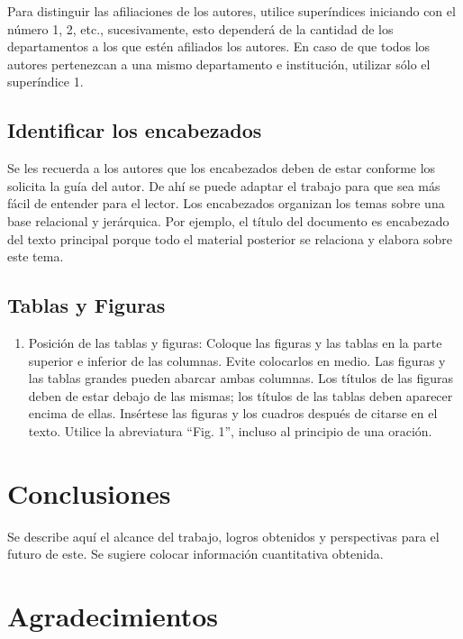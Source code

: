     Para distinguir las afiliaciones de los autores, utilice superíndices iniciando con el número 1, 2, etc., sucesivamente, esto dependerá de la cantidad de los departamentos a los que estén afiliados los autores. En caso de que todos los autores pertenezcan a una mismo departamento e institución, utilizar sólo el superíndice 1. 
    
    \subsection{Identificar los encabezados}
    
    Se les recuerda a los autores que los encabezados deben de estar conforme los solicita la guía del autor. De ahí se puede adaptar el trabajo para que sea más fácil de entender para el lector.
    Los encabezados organizan los temas sobre una base relacional y jerárquica. Por ejemplo, el título del documento es encabezado del texto principal porque todo el material posterior se relaciona y elabora sobre este tema. 
    
    \subsection{Tablas y Figuras}
    
    \begin{enumerate}
        \item Posición de las tablas y figuras: Coloque las figuras y las tablas en la parte superior e inferior de las columnas. Evite colocarlos en medio. Las figuras y las tablas grandes pueden abarcar ambas columnas. Los títulos de las figuras deben de estar debajo de las mismas; los títulos de las tablas deben aparecer encima de ellas. Insértese las figuras y los cuadros después de citarse en el texto. Utilice la abreviatura “Fig. 1”, incluso al principio de una oración. 
    \end{enumerate}
    
    \section{Conclusiones}
    
    Se describe aquí el alcance del trabajo, logros obtenidos y perspectivas para el futuro de este. Se sugiere colocar información cuantitativa obtenida.
    
    \section{Agradecimientos}
    
